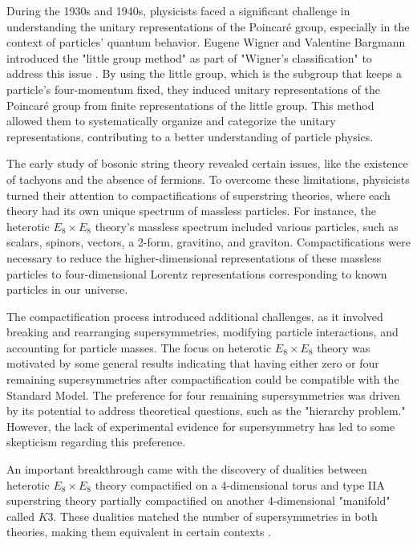 \documentclass[12pt]{article}
\begin{document}
During the 1930s and 1940s, physicists faced a significant challenge in understanding the unitary representations of the Poincaré group, especially in the context of particles' quantum behavior. Eugene Wigner and Valentine Bargmann introduced the "little group method" as part of "Wigner's classification" to address this issue \cite{wigner1939unitary, Bargmann1947}. By using the little group, which is the subgroup that keeps a particle's four-momentum fixed, they induced unitary representations of the Poincaré group from finite representations of the little group. This method allowed them to systematically organize and categorize the unitary representations, contributing to a better understanding of particle physics.

The early study of bosonic string theory revealed certain issues, like the existence of tachyons and the absence of fermions. To overcome these limitations, physicists turned their attention to compactifications of superstring theories, where each theory had its own unique spectrum of massless particles. For instance, the heterotic $E_8 \times E_8$ theory's massless spectrum included various particles, such as scalars, spinors, vectors, a 2-form, gravitino, and graviton. Compactifications were necessary to reduce the higher-dimensional representations of these massless particles to four-dimensional Lorentz representations corresponding to known particles in our universe.

The compactification process introduced additional challenges, as it involved breaking and rearranging supersymmetries, modifying particle interactions, and accounting for particle masses. The focus on heterotic $E_8 \times E_8$ theory was motivated by some general results indicating that having either zero or four remaining supersymmetries after compactification could be compatible with the Standard Model. The preference for four remaining supersymmetries was driven by its potential to address theoretical questions, such as the "hierarchy problem." However, the lack of experimental evidence for supersymmetry has led to some skepticism regarding this preference.

An important breakthrough came with the discovery of dualities between heterotic $E_8 \times E_8$ theory compactified on a 4-dimensional torus and type IIA superstring theory partially compactified on another 4-dimensional "manifold" called $K3$. These dualities matched the number of supersymmetries in both theories, making them equivalent in certain contexts \cite{Candelas1991}.
\end{document}
